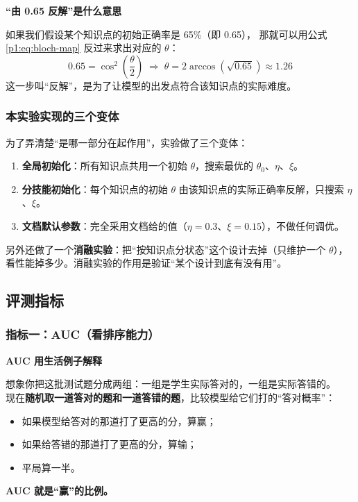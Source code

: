 \documentclass[UTF8,a4paper,11pt]{ctexart}
\newenvironment{explainbox}[1]
{\begin{center}\begin{minipage}{0.94\textwidth}\colorbox{boxbg}{\parbox{0.92\textwidth}{\textbf{#1}\par\vspace{2pt}}}}
{\end{minipage}\end{center}}
\begin{document}
\begin{explainbox}{“由 0.65 反解”是什么意思}
如果我们假设某个知识点的初始正确率是 65\%（即 0.65），
那就可以用公式 \eqref{p1:eq:bloch-map} 反过来求出对应的 $\theta$：\\
\begin{equation*}
0.65 = \cos^2\!\left(\frac{\theta}{2}\right)
\;\Longrightarrow\;
\theta = 2\arccos(\sqrt{0.65}) \approx 1.26
\end{equation*}
这一步叫“反解”，是为了让模型的出发点符合该知识点的实际难度。
\end{explainbox}

\subsubsection{本实验实现的三个变体}

为了弄清楚“是哪一部分在起作用”，实验做了三个变体：

\begin{enumerate}[leftmargin=1.8em]
\item \textbf{全局初始化}：所有知识点共用一个初始 $\theta$，搜索最优的 $\theta_0$、$\eta$、$\xi$。
\item \textbf{分技能初始化}：每个知识点的初始 $\theta$ 由该知识点的实际正确率反解，只搜索 $\eta$、$\xi$。
\item \textbf{文档默认参数}：完全采用文档给的值（$\eta=0.3$、$\xi=0.15$），不做任何调优。
\end{enumerate}

另外还做了一个\textbf{消融实验}：把“按知识点分状态”这个设计去掉（只维护一个 $\theta$），
看性能掉多少。消融实验的作用是验证“某个设计到底有没有用”。

\subsection{评测指标}

\subsubsection{指标一：AUC（看排序能力）}

\begin{explainbox}{AUC 用生活例子解释}
想象你把这批测试题分成两组：一组是学生实际答对的，一组是实际答错的。\\
现在\textbf{随机取一道答对的题和一道答错的题}，比较模型给它们打的“答对概率”：
\begin{itemize}[leftmargin=1.4em,itemsep=1pt]
\item 如果模型给答对的那道打了更高的分，算赢；
\item 如果给答错的那道打了更高的分，算输；
\item 平局算一半。
\end{itemize}
\textbf{AUC 就是“赢”的比例。}
\end{explainbox}
\end{document}
